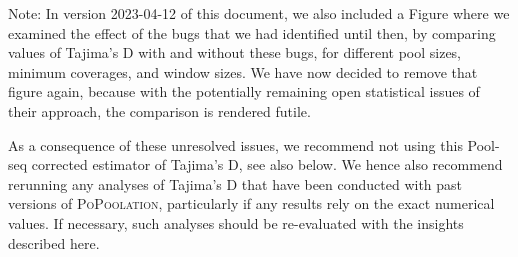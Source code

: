 \documentclass[a4paper,fontsize=9pt,DIV=14]{scrartcl}
\newcounter{todo}
\newcommand\todo[1]{}
\newcommand\toolname{\textsc}
\newcommand\figref[1]{Figure~\ref{#1}}
\newcommand\eqnref[1]{Eq.~(\ref{#1})}
\newcommand{\coverage}{c}
\begin{document}
\todo{important unmentioned and unresolved bugs:  (1) using min b for the n tilde computation seems super wrong as well.  (2) Harmonic numbers appear in the Achaz formulae, but we plug in the “effective” number of individuals which is generally not an integer. But the usual harmonic numbers are defined only for integers.  (3) the last position of a window is accidentally used as the first of the following instead.}


Note: In version 2023-04-12 of this document, we also included a Figure where we examined the effect of the bugs that we had identified until then, by comparing values of Tajima's D with and without these bugs, for different pool sizes, minimum coverages, and window sizes.  We have now decided to remove that figure again, because with the potentially remaining open statistical issues of their approach, the comparison is rendered futile.

As a consequence of these unresolved issues, we recommend not using this Pool-seq corrected estimator of Tajima's D, see also below.
We hence also recommend rerunning any analyses of Tajima's D that have been conducted with past versions of \toolname{PoPoolation}, particularly if any results rely on the exact numerical values.  If necessary, such analyses should be re-evaluated with the insights described here.
\end{document}
